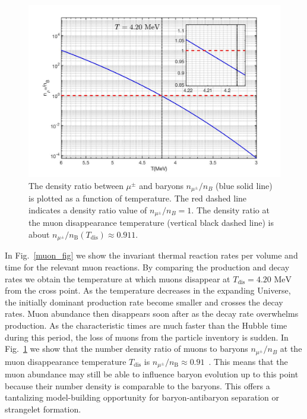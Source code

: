 \documentclass[universe,article,submit,moreauthors,pdftex,a4paper]{Definitions/mdpi}
\newcommand{\MeV}{\text{ MeV}}
\newcommand*{\rf}[1]{Fig.~{\ref{#1}}}
\begin{document}
\begin{figure}[ht]
\centering
\includegraphics[width=0.9\columnwidth]{./plots/DensityRatio_new2.jpg}
\caption{The density ratio between $\mu^\pm$ and baryons $n_{\mu^{\pm}}/n_{B}$ (blue solid line) is plotted as a function of temperature. The red dashed line indicates a density ratio value of $n_{\mu^{\pm}}/n_{B}=1$. The density ratio at the muon disappearance temperature (vertical black dashed line) is about $n_{\mu^\pm}/n_\mathrm{B}(T_\mathrm{dis})\approx0.911$.}
\label{muonRatio_fig} 
\end{figure}

In \rf{muon_fig} we show the invariant thermal reaction rates per volume and time for the relevant muon reactions. By comparing the production and decay rates we obtain the temperature at which muons disappear at $T_\mathrm{dis} = 4.20\MeV$ from the cross point. As the temperature decreases in the expanding Universe, the initially dominant production rate become smaller and crosses the decay rates. Muon abundance then disappears soon after as the decay rate overwhelms production. As the characteristic times are much faster than the Hubble time during this period, the loss of muons from the particle inventory is sudden. In \rf{muonRatio_fig} we show that the number density ratio of muons to baryons $n_{\mu^{\pm}}/n_{B}$ at the muon disappearance temperature $T_\mathrm{dis}$ is $n_{\mu^\pm}/n_\mathrm{B}\approx0.91$~\cite{Yang:2021bko}. This means that the muon abundance may still be able to influence baryon evolution up to this point because their number density is comparable to the baryons. This offers a tantalizing model-building opportunity for baryon-antibaryon separation or strangelet formation.
\end{document}
